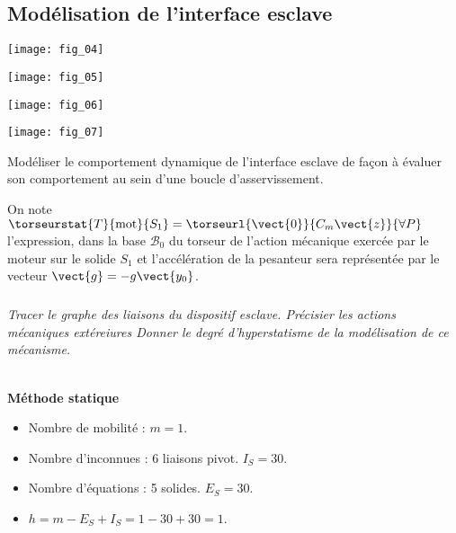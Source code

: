 \begin{multicols}{2}
\ifprof
\newpage
\else
\fi

\section*{Modélisation de l’interface esclave}
\ifprof
\else

\begin{center}
\texttt{[image: fig\_04]}
\end{center}

\begin{center}
\texttt{[image: fig\_05]}
\end{center}

\begin{center}
\texttt{[image: fig\_06]}
\end{center}

\begin{center}
\texttt{[image: fig\_07]}
\end{center}

\fi

\begin{obj}
Modéliser le comportement dynamique de l’interface esclave de façon à évaluer son
comportement au sein d’une boucle d’asservissement.
\end{obj}

\ifprof
\else

On note $\torseurstat{T}{\text{mot}}{S_1}=\torseurl{\vect{0}}{C_m\vect{z}}{\forall P}$ l’expression, dans la base $\mathcal{B}_0$ du torseur de l’action mécanique exercée par le moteur sur le solide $S_1$ et
l’accélération de la pesanteur sera représentée par le vecteur $\vect{g} = -g \vect{y_0}$.

\fi
\subparagraph{}\textit{Tracer le graphe des liaisons du dispositif esclave. Précisier les actions mécaniques extéreiures Donner le degré d’hyperstatisme de la modélisation de ce mécanisme.}
\ifprof
\begin{corrige}~\\

\textbf{Méthode statique}
\begin{itemize}
\item Nombre de mobilité : $m=1$.
\item Nombre d'inconnues : 6 liaisons pivot. $I_S=30$. 
\item Nombre d'équations : 5 solides. $E_S = 30$. 
\item $h=m-E_S+I_S = 1-30+30=1$. 
\end{itemize}


\end{corrige}
\end{multicols}
